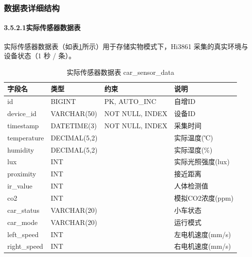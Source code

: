 \documentclass{article}
\begin{document}
\subsubsection{数据表详细结构}

\paragraph{3.5.2.1实际传感器数据表}

实际传感器数据表（如表\ref{tab:实际传感器数据表}所示）用于存储实物模式下，Hi3861 采集的真实环境与设备状态（1 秒 / 条）。

\begin{table}[htbp]
  \centering
  \caption{实际传感器数据表 car\_sensor\_data}
  \label{tab:实际传感器数据表}
  \tiny
  \begin{tabular}{|l|l|l|l|}
    \hline
    字段名          & 类型         & 约束                        & 说明              \\
    \hline
    id              & BIGINT       & PK, AUTO\_INC               & 自增ID            \\
    device\_id       & VARCHAR(50)  & NOT NULL, INDEX             & 设备ID            \\
    timestamp       & DATETIME(3)  & NOT NULL, INDEX             & 采集时间          \\
    temperature     & DECIMAL(5,2) &                             & 实际温度(℃)       \\
    humidity        & DECIMAL(5,2) &                             & 实际湿度(\%)       \\
    lux             & INT          &                             & 实际光照强度(lux) \\
    proximity       & INT          &                             & 接近距离          \\
    ir\_value        & INT          &                             & 人体检测值        \\
    co2             & INT          &                             & 模拟CO2浓度(ppm)  \\
    car\_status      & VARCHAR(20)  &                             & 小车状态          \\
    car\_mode        & VARCHAR(20)  &                             & 运行模式          \\
    left\_speed      & INT          &                             & 左电机速度(mm/s)  \\
    right\_speed     & INT          &                             & 右电机速度(mm/s)  \\

\end{tabular}
\end{table}
\end{document}
